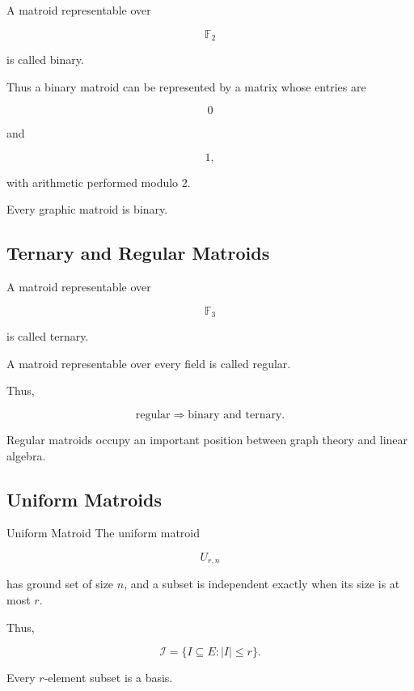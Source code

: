 A matroid representable over

\[
\mathbb{F}_2
\]

is called binary.

Thus a binary matroid can be represented by a matrix whose entries are

\[
0
\]

and

\[
1,
\]

with arithmetic performed modulo \(2\).

Every graphic matroid is binary.

\subsection{Ternary and Regular Matroids}
\label{subsec:ternary-regular-matroids}

A matroid representable over

\[
\mathbb{F}_3
\]

is called ternary.

A matroid representable over every field is called regular.

Thus,

\[
\boxed{
\text{regular}
\Longrightarrow
\text{binary and ternary}.
}
\]

Regular matroids occupy an important position between graph theory and
linear algebra.

\subsection{Uniform Matroids}
\label{subsec:uniform-matroids}

\begin{definitionbox}{Uniform Matroid}
The uniform matroid

\[
\boxed{
U_{r,n}
}
\]

has ground set of size \(n\), and a subset is independent exactly when
its size is at most \(r\).
\end{definitionbox}

Thus,

\[
\mathcal{I}
=
\{
I\subseteq E:
|I|\leq r
\}.
\]

Every \(r\)-element subset is a basis.

